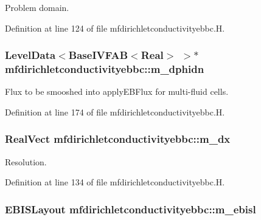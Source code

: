 Problem domain. 



Definition at line 124 of file mfdirichletconductivityebbc.\+H.

\subsubsection[{\texorpdfstring{m\+\_\+dphidn}{m_dphidn}}]{\setlength{\rightskip}{0pt plus 5cm}Level\+Data$<$Base\+I\+V\+F\+AB$<$Real$>$ $>$$\ast$ mfdirichletconductivityebbc\+::m\+\_\+dphidn\hspace{0.3cm}{\ttfamily [protected]}}\hypertarget{classmfdirichletconductivityebbc_acefc13fd067aa302b9b8f5a08bd91b1a}{}\label{classmfdirichletconductivityebbc_acefc13fd067aa302b9b8f5a08bd91b1a}


Flux to be smooshed into apply\+E\+B\+Flux for multi-\/fluid cells. 



Definition at line 174 of file mfdirichletconductivityebbc.\+H.

\subsubsection[{\texorpdfstring{m\+\_\+dx}{m_dx}}]{\setlength{\rightskip}{0pt plus 5cm}Real\+Vect mfdirichletconductivityebbc\+::m\+\_\+dx\hspace{0.3cm}{\ttfamily [protected]}}\hypertarget{classmfdirichletconductivityebbc_abf8b613b943dddd09e7f474c295c624d}{}\label{classmfdirichletconductivityebbc_abf8b613b943dddd09e7f474c295c624d}


Resolution. 



Definition at line 134 of file mfdirichletconductivityebbc.\+H.

\subsubsection[{\texorpdfstring{m\+\_\+ebisl}{m_ebisl}}]{\setlength{\rightskip}{0pt plus 5cm}E\+B\+I\+S\+Layout mfdirichletconductivityebbc\+::m\+\_\+ebisl\hspace{0.3cm}{\ttfamily [protected]}}\hypertarget{classmfdirichletconductivityebbc_aeb34494a9181822968efb708647d365b}{}\label{classmfdirichletconductivityebbc_aeb34494a9181822968efb708647d365b}


